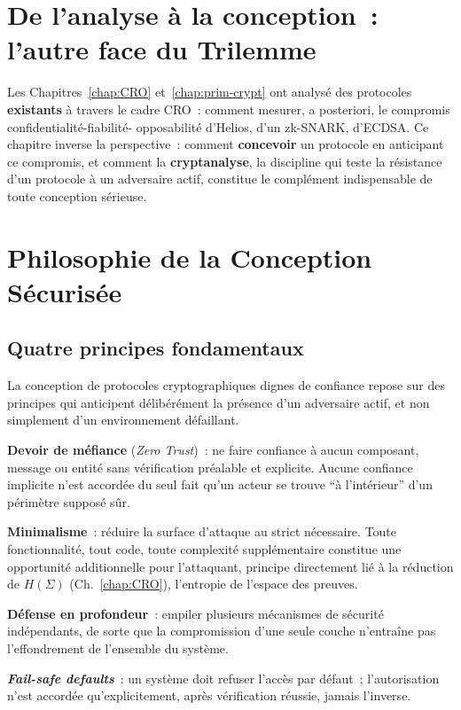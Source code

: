 \section*{De l'analyse à la conception~: l'autre face du Trilemme}

Les Chapitres~\ref{chap:CRO} et~\ref{chap:prim-crypt} ont analysé
des protocoles \textbf{existants} à travers le cadre CRO~: comment
mesurer, a posteriori, le compromis confidentialité-fiabilité-
opposabilité d'Helios, d'un zk-SNARK, d'ECDSA. Ce chapitre inverse
la perspective~: comment \textbf{concevoir} un protocole en
anticipant ce compromis, et comment la \textbf{cryptanalyse},
la discipline qui teste la résistance d'un protocole à un adversaire
actif, constitue le complément indispensable de toute conception
sérieuse.

\separateur

\section{Philosophie de la Conception Sécurisée}
\label{sec:philosophie-conception}

\subsection{Quatre principes fondamentaux}

La conception de protocoles cryptographiques dignes de confiance
repose sur des principes qui anticipent délibérément la présence
d'un adversaire actif, et non simplement d'un environnement
défaillant.

\begin{boxdef}
\textbf{Devoir de méfiance} (\textit{Zero Trust})~: ne faire confiance
à aucun composant, message ou entité sans vérification préalable et
explicite. Aucune confiance implicite n'est accordée du seul fait
qu'un acteur se trouve ``à l'intérieur'' d'un périmètre supposé sûr.

\textbf{Minimalisme}~: réduire la surface d'attaque au strict
nécessaire. Toute fonctionnalité, tout code, toute complexité
supplémentaire constitue une opportunité additionnelle pour
l'attaquant, principe directement lié à la réduction de
$H(\Sigma)$ (Ch.~\ref{chap:CRO}), l'entropie de l'espace des preuves.

\textbf{Défense en profondeur}~: empiler plusieurs mécanismes de
sécurité indépendants, de sorte que la compromission d'une seule
couche n'entraîne pas l'effondrement de l'ensemble du système.

\textbf{\textit{Fail-safe defaults}}~: un système doit refuser
l'accès par défaut~; l'autorisation n'est accordée qu'explicitement,
après vérification réussie, jamais l'inverse.
\end{boxdef}


